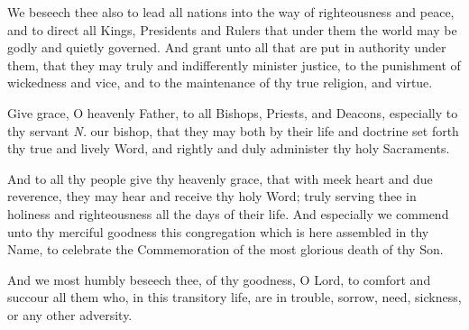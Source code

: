 


We beseech thee also to lead all nations into the way of righteousness and peace, and to direct all Kings, Presidents and Rulers that under them the world may be godly and quietly governed. 
And grant unto all that are put in authority under them, 
that they may truly and indifferently minister justice, to the punishment of wickedness and vice, and to the maintenance of thy true religion, and virtue.

Give grace, O heavenly Father, to all Bishops, Priests, and Deacons, 
especially to thy servant \emph{N.} our bishop, %
that they may both by their life and doctrine set forth thy true and lively Word, and rightly and duly administer thy holy Sacraments.

And to all thy people give thy heavenly grace,
that with meek heart and due reverence, they may hear and receive thy holy Word; truly serving thee in holiness and righteousness all the days of their life.
And especially we commend unto thy merciful goodness this congregation which is here assembled in thy Name, to celebrate the Commemoration of the most glorious death of thy Son.

And we most humbly beseech thee, of thy goodness, O Lord, to comfort and succour all them who, in this transitory life, are in trouble, sorrow, need, sickness, or any other adversity.


